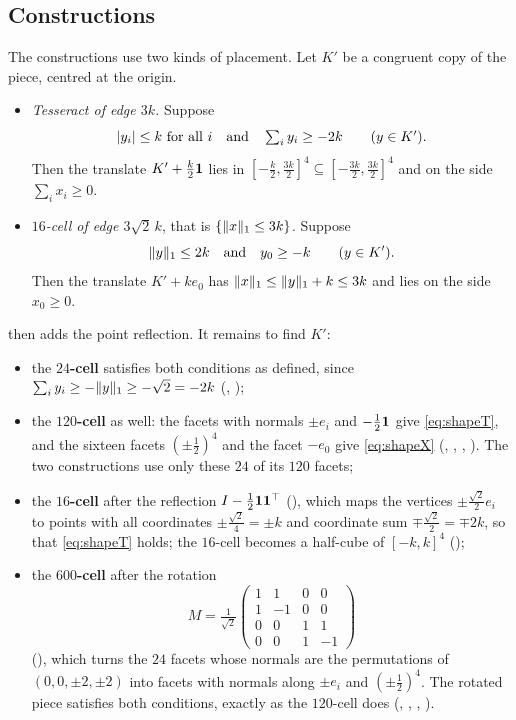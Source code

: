 \documentclass[11pt,a4paper]{article}
\begin{document}
\subsection{Constructions}
The constructions use two kinds of placement. Let $K'$ be a congruent copy of the piece, centred at the origin.
\begin{itemize}
\item \emph{Tesseract of edge $3k$.} Suppose
\begin{equation}\label{eq:shapeT}
\lvert y_i\rvert\le k\ \text{for all } i\quad\text{and}\quad \textstyle\sum_iy_i\ge-2k\qquad(y\in K').
\end{equation}
Then the translate $K'+\tfrac k2\mathbf 1$ lies in $[-\tfrac k2,\tfrac{3k}2]^4\subseteq[-\tfrac{3k}2,\tfrac{3k}2]^4$ and on the side $\sum_ix_i\ge0$.
\item \emph{$16$-cell of edge $3\sqrt2\,k$}, that is $\{\lVert x\rVert_1\le3k\}$. Suppose
\begin{equation}\label{eq:shapeX}
\lVert y\rVert_1\le2k\quad\text{and}\quad y_0\ge-k\qquad(y\in K').
\end{equation}
Then the translate $K'+ke_0$ has $\lVert x\rVert_1\le\lVert y\rVert_1+k\le3k$ and lies on the side $x_0\ge0$.
\end{itemize}
 then adds the point reflection. It remains to find $K'$:
\begin{itemize}
\item the \textbf{$24$-cell} satisfies both conditions as defined, since $\sum_iy_i\ge-\lVert y\rVert_1\ge-\sqrt2=-2k$ (, );
\item the \textbf{$120$-cell} as well: the facets with normals $\pm e_i$ and $-\tfrac12\mathbf 1$ give \eqref{eq:shapeT}, and the sixteen facets $(\pm\tfrac12)^4$ and the facet $-e_0$ give \eqref{eq:shapeX} (, , , ). The two constructions use only these $24$ of its $120$ facets;
\item the \textbf{$16$-cell} after the reflection $I-\tfrac12\mathbf 1\mathbf 1^\top$ (), which maps the vertices $\pm\tfrac{\sqrt2}{2}e_i$ to points with all coordinates $\pm\tfrac{\sqrt2}{4}=\pm k$ and coordinate sum $\mp\tfrac{\sqrt2}{2}=\mp2k$, so that \eqref{eq:shapeT} holds; the $16$-cell becomes a half-cube of $[-k,k]^4$ ();
\item the \textbf{$600$-cell} after the rotation
\[
M=\tfrac{1}{\sqrt2}\begin{pmatrix}1&1&0&0\\1&-1&0&0\\0&0&1&1\\0&0&1&-1\end{pmatrix}
\]
(), which turns the $24$ facets whose normals are the permutations of $(0,0,\pm2,\pm2)$ into facets with normals along $\pm e_i$ and $(\pm\tfrac12)^4$. The rotated piece satisfies both conditions, exactly as the $120$-cell does (, , , ).
\end{itemize}
\end{document}
